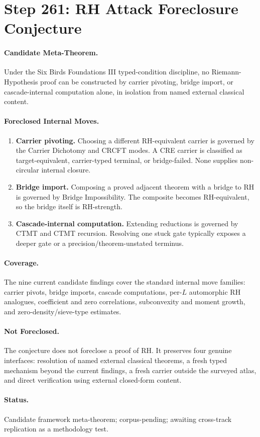 \section*{Step 261: RH Attack Foreclosure Conjecture}

\paragraph{Candidate Meta-Theorem.}
Under the Six Birds Foundations III typed-condition discipline, no
Riemann-Hypothesis proof can be constructed by carrier pivoting, bridge import,
or cascade-internal computation alone, in isolation from named external
classical content.

\paragraph{Foreclosed Internal Moves.}
\begin{enumerate}
\item \textbf{Carrier pivoting.}  Choosing a different RH-equivalent carrier is
governed by the Carrier Dichotomy and CRCFT modes.  A CRE carrier is classified
as target-equivalent, carrier-typed terminal, or bridge-failed.  None supplies
non-circular internal closure.
\item \textbf{Bridge import.}  Composing a proved adjacent theorem with a bridge
to RH is governed by Bridge Impossibility.  The composite becomes
RH-equivalent, so the bridge itself is RH-strength.
\item \textbf{Cascade-internal computation.}  Extending reductions is governed
by CTMT and CTMT recursion.  Resolving one stuck gate typically exposes a deeper
gate or a precision/theorem-unstated terminus.
\end{enumerate}

\paragraph{Coverage.}
The nine current candidate findings cover the standard internal move families:
carrier pivots, bridge imports, cascade computations, per-$L$ automorphic RH
analogues, coefficient and zero correlations, subconvexity and moment growth,
and zero-density/sieve-type estimates.

\paragraph{Not Foreclosed.}
The conjecture does not foreclose a proof of RH.  It preserves four genuine
interfaces: resolution of named external classical theorems, a fresh typed
mechanism beyond the current findings, a fresh carrier outside the surveyed
atlas, and direct verification using external closed-form content.

\paragraph{Status.}
Candidate framework meta-theorem; corpus-pending; awaiting cross-track
replication as a methodology test.
